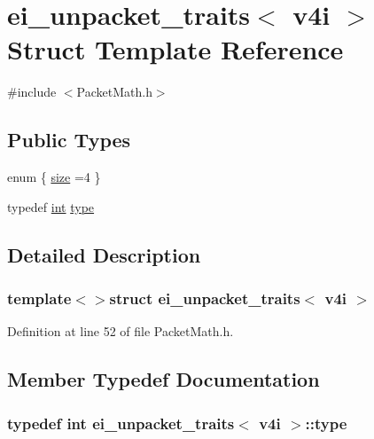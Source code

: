 \hypertarget{structei__unpacket__traits_3_01v4i_01_4}{\section{ei\-\_\-unpacket\-\_\-traits$<$ v4i $>$ Struct Template Reference}
\label{structei__unpacket__traits_3_01v4i_01_4}
}


{\ttfamily \#include $<$Packet\-Math.\-h$>$}

\subsection*{Public Types}
\begin{DoxyCompactItemize}
\item 
enum \{ \hyperlink{structei__unpacket__traits_3_01v4i_01_4_aa13f397afef41088f154d3083d742cbfa07f9c6d3fa3efda8f30b041d1a911a22}{size} =4
 \}
\item 
typedef \hyperlink{ioapi_8h_a787fa3cf048117ba7123753c1e74fcd6}{int} \hyperlink{structei__unpacket__traits_3_01v4i_01_4_a8650c5bf1356d24343dac2724fcc4e68}{type}
\end{DoxyCompactItemize}


\subsection{Detailed Description}
\subsubsection*{template$<$$>$struct ei\-\_\-unpacket\-\_\-traits$<$ v4i $>$}



Definition at line 52 of file Packet\-Math.\-h.



\subsection{Member Typedef Documentation}
\hypertarget{structei__unpacket__traits_3_01v4i_01_4_a8650c5bf1356d24343dac2724fcc4e68}{
\subsubsection[{type}]{\setlength{\rightskip}{0pt plus 5cm}typedef {\bf int} {\bf ei\-\_\-unpacket\-\_\-traits}$<$ {\bf v4i} $>$\-::{\bf type}}}\label{structei__unpacket__traits_3_01v4i_01_4_a8650c5bf1356d24343dac2724fcc4e68}


